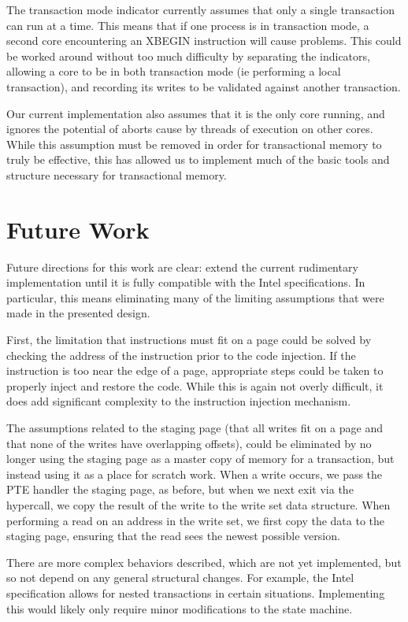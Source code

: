 \documentclass{acm_proc_article-sp}
\begin{document}
The transaction mode indicator currently assumes that only a single
transaction can run at a time. This means that if one process is in transaction
mode, a second core encountering an XBEGIN instruction will cause problems.
This could be worked around without too much difficulty by separating the
indicators, allowing a core to be in both transaction mode (ie performing
a local transaction), and recording its writes to be validated against
another transaction.

Our current implementation also assumes that it is the only core running, and
ignores the potential of aborts cause by threads of execution on other cores.
While this assumption must be removed in order for transactional memory to
truly be effective, this has allowed us to implement much of the basic tools
and structure necessary for transactional memory.
 

\section{Future Work}

Future directions for this work are clear: extend the current rudimentary 
implementation until it is fully compatible with the Intel specifications. In
particular, this means eliminating many of the limiting assumptions that were
made in the presented design.

First, the limitation that instructions must fit on a page could be solved by
checking the address of the instruction prior to the code injection. If the 
instruction is too near the edge of a page, appropriate steps could be taken
to properly inject and restore the code. While this is again not overly 
difficult, it does add significant complexity to the instruction injection
mechanism.

The assumptions related to the staging page (that all writes fit on a page
and that none of the writes have overlapping offsets), could be eliminated
by no longer using the staging page as a master copy of memory for a 
transaction, but instead using it as a place for scratch work. When a 
write occurs, we pass the PTE handler the staging page, as before, but when we 
next exit via the hypercall, we copy the result of the write to the write set
data structure. When performing a read on an address in the write set,
we first copy the data to the staging page, ensuring that the read sees the
newest possible version.

There are more complex behaviors described, which are not yet
implemented, but so not depend on any general structural changes. For example,
the Intel specification allows for nested transactions in certain situations.
Implementing this would likely only require minor modifications to the state
machine. 
\end{document}
